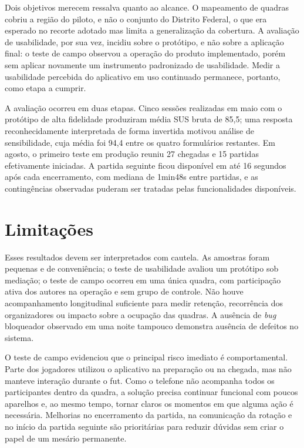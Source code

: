 Dois objetivos merecem ressalva quanto ao alcance. O mapeamento de quadras cobriu a região do piloto, e não o conjunto do Distrito Federal, o que era esperado no recorte adotado mas limita a generalização da cobertura. A avaliação de usabilidade, por sua vez, incidiu sobre o protótipo, e não sobre a aplicação final: o teste de campo observou a operação do produto implementado, porém sem aplicar novamente um instrumento padronizado de usabilidade. Medir a usabilidade percebida do aplicativo em uso continuado permanece, portanto, como etapa a cumprir.

A avaliação ocorreu em duas etapas. Cinco sessões realizadas em maio com o protótipo de alta fidelidade produziram média SUS bruta de 85,5; uma resposta reconhecidamente interpretada de forma invertida motivou análise de sensibilidade, cuja média foi 94,4 entre os quatro formulários restantes. Em agosto, o primeiro teste em produção reuniu 27 chegadas e 15 partidas efetivamente iniciadas. A partida seguinte ficou disponível em até 16 segundos após cada encerramento, com mediana de 1min48s entre partidas, e as contingências observadas puderam ser tratadas pelas funcionalidades disponíveis.


\section{Limitações}
Esses resultados devem ser interpretados com cautela. As amostras foram pequenas e de conveniência; o teste de usabilidade avaliou um protótipo sob mediação; o teste de campo ocorreu em uma única quadra, com participação ativa dos autores na operação e sem grupo de controle. Não houve acompanhamento longitudinal suficiente para medir retenção, recorrência dos organizadores ou impacto sobre a ocupação das quadras. A ausência de \textit{bug} bloqueador observado em uma noite tampouco demonstra ausência de defeitos no sistema.

O teste de campo evidenciou que o principal risco imediato é comportamental. Parte dos jogadores utilizou o aplicativo na preparação ou na chegada, mas não manteve interação durante o fut. Como o telefone não acompanha todos os participantes dentro da quadra, a solução precisa continuar funcional com poucos aparelhos e, ao mesmo tempo, tornar claros os momentos em que alguma ação é necessária. Melhorias no encerramento da partida, na comunicação da rotação e no início da partida seguinte são prioritárias para reduzir dúvidas sem criar o papel de um mesário permanente.


